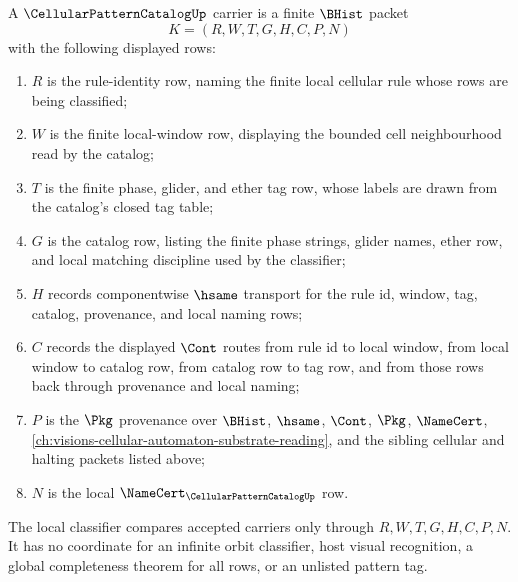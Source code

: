 \begin{definition}
\label{def:cellular-pattern-catalog-carrier}
A $\CellularPatternCatalogUp$ carrier is a finite $\BHist$ packet
$$
K=(R,W,T,G,H,C,P,N)
$$
with the following displayed rows:
\begin{enumerate}
\item $R$ is the rule-identity row, naming the finite local cellular rule whose rows are being classified;
\item $W$ is the finite local-window row, displaying the bounded cell neighbourhood read by the catalog;
\item $T$ is the finite phase, glider, and ether tag row, whose labels are drawn from the catalog's closed tag table;
\item $G$ is the catalog row, listing the finite phase strings, glider names, ether row, and local matching discipline used by the classifier;
\item $H$ records componentwise $\hsame$ transport for the rule id, window, tag, catalog, provenance, and local naming rows;
\item $C$ records the displayed $\Cont$ routes from rule id to local window, from local window to catalog row, from catalog row to tag row, and from those rows back through provenance and local naming;
\item $P$ is the $\Pkg$ provenance over $\BHist$, $\hsame$, $\Cont$, $\Pkg$, $\NameCert$, \autoref{ch:visions-cellular-automaton-substrate-reading}, and the sibling cellular and halting packets listed above;
\item $N$ is the local $\NameCert_{\CellularPatternCatalogUp}$ row.
\end{enumerate}
The local classifier compares accepted carriers only through $R,W,T,G,H,C,P,N$. It has no coordinate for an infinite orbit classifier, host visual recognition, a global completeness theorem for all rows, or an unlisted pattern tag.
\end{definition}

